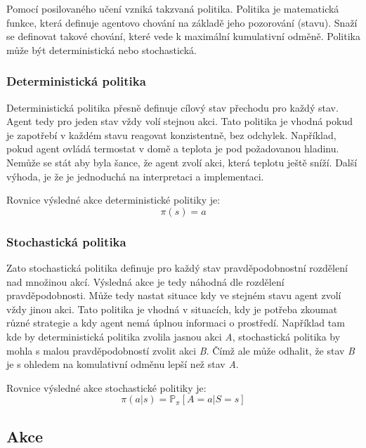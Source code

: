 Pomocí posilovaného učení vzniká takzvaná politika.
Politika je matematická funkce, která definuje agentovo chování na základě jeho pozorování (stavu).
Snaží se definovat takové chování, které vede k maximální kumulativní odměně.
Politika může být deterministická nebo stochastická.

  \subsubsection*{Deterministická politika}
  
  Deterministická politika přesně definuje cílový stav přechodu pro každý stav.
  Agent tedy pro jeden stav vždy volí stejnou akci.
  Tato politika je vhodná pokud je zapotřebí v každém stavu reagovat konzistentně, bez odchylek.
  Například, pokud agent ovládá termostat v domě a teplota je pod požadovanou hladinu.
  Nemůže se stát aby byla šance, že agent zvolí akci, která teplotu ještě sníží.
  Další výhoda, je že je jednoduchá na interpretaci a implementaci.\cite{Policies}

  Rovnice výsledné akce deterministické politiky je:
  \begin{equation}
    \pi(s) = a\label{eq:policy_deterministic}
  \end{equation}

  \subsubsection*{Stochastická politika}
  
  Zato stochastická politika definuje pro každý stav pravděpodobnostní rozdělení nad množinou akcí.
  Výsledná akce je tedy náhodná dle rozdělení pravděpodobnosti.
  Může tedy nastat situace kdy ve stejném stavu agent zvolí vždy jinou akci.
  Tato politika je vhodná v situacích, kdy je potřeba zkoumat různé strategie a kdy agent nemá úplnou informaci o prostředí.
  Například tam kde by deterministická politika zvolila jasnou akci \textit{A}, stochastická politika by mohla  s malou pravděpodobností zvolit akci \textit{B}.
  Čímž ale může odhalit, že stav \textit{B} je s ohledem na komulativní odměnu lepší než stav \textit{A}.\cite{Policies}

  Rovnice výsledné akce stochastické politiky je:
  \begin{equation}
    \pi(a \vert s) = \mathbb{P}_\pi [A=a \vert S=s]\label{eq:policy_stochastic}
  \end{equation}

\subsection{Akce}\label{subsec:akce}

